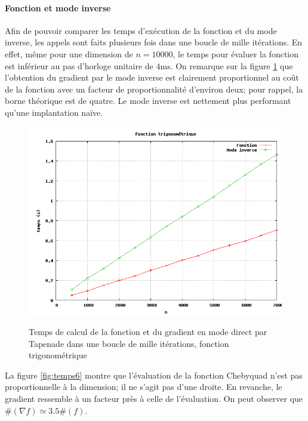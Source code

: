 





\paragraph{Fonction et mode inverse}

Afin de pouvoir comparer les temps d'ex\'ecution de la fonction et du mode inverse, les appels sont faits
plusieurs fois dans une boucle de mille it\'erations. En effet, même pour une dimension de $n=10000$,
 le temps pour \'evaluer la fonction est inf\'erieur au pas d'horloge unitaire de $4$ms. On remarque sur la
 figure \ref{fig:temps2} que l'obtention du gradient par le mode
inverse est clairement proportionnel au coût de la fonction avec un facteur de proportionnalit\'e d'environ
deux; pour rappel, la borne th\'eorique est de quatre. Le mode inverse est nettement plus performant qu'une implantation na\"ive.


\begin{figure}
\caption{Temps de calcul de la fonction et du gradient en mode direct par Tapenade dans une boucle de mille it\'erations, fonction trigonom\'etrique}
\center
\includegraphics[scale=0.4]{figures/temps2.png}
\label{fig:temps2}
\end{figure}


La figure \ref{fig:temps6} montre que l'\'evaluation de la fonction Chebyquad n'est pas proportionnelle \`a la dimension; il ne s'agit pas d'une droite.
En revanche, le gradient ressemble \`a un facteur pr\`es \`a celle de l'\'evaluation. On peut observer que $\#(\nabla f)\simeq 3.5 \#(f)$.


